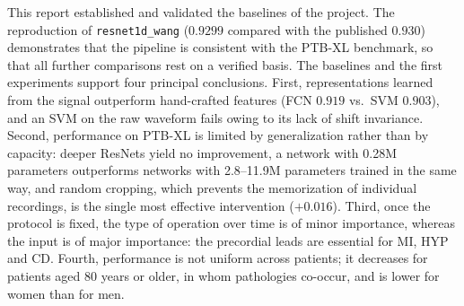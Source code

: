 \documentclass{article}
\newcommand{\wang}{\texttt{resnet1d\_wang}}
\begin{document}
This report established and validated the baselines of the project. The reproduction of \wang{} ($0.9299$ compared with the published $0.930$) demonstrates that the pipeline is consistent with the PTB-XL benchmark, so that all further comparisons rest on a verified basis. The baselines and the first experiments support four principal conclusions. First, representations learned from the signal outperform hand-crafted features (FCN $0.919$ vs.\ SVM $0.903$), and an SVM on the raw waveform fails owing to its lack of shift invariance. Second, performance on PTB-XL is limited by generalization rather than by capacity: deeper ResNets yield no improvement, a network with 0.28M parameters outperforms networks with 2.8--11.9M parameters trained in the same way, and random cropping, which prevents the memorization of individual recordings, is the single most effective intervention ($+0.016$). Third, once the protocol is fixed, the type of operation over time is of minor importance, whereas the input is of major importance: the precordial leads are essential for MI, HYP and CD. Fourth, performance is not uniform across patients; it decreases for patients aged 80 years or older, in whom pathologies co-occur, and is lower for women than for men.
\end{document}
